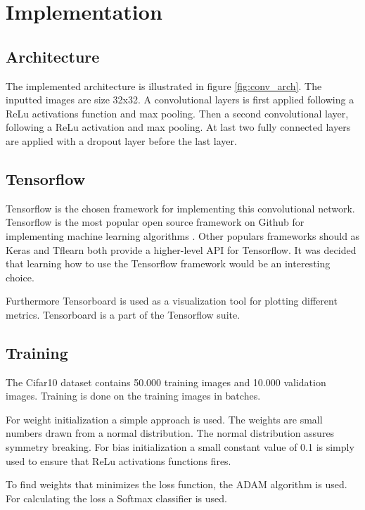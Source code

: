 \chapter{Implementation}
\label{chp:imp}

\section{Architecture}
The implemented architecture is illustrated in figure \ref{fig:conv_arch}. The inputted images are size 32x32. A convolutional layers is first applied following a ReLu activations function and max pooling. Then a second convolutional layer, following a ReLu activation and max pooling. At last two fully connected layers are applied with a dropout layer before the last layer.


\section{Tensorflow}
Tensorflow is the chosen framework for implementing this convolutional network. Tensorflow is the most popular open source framework on Github for implementing machine learning algorithms \citep{ML_frameworks}. Other populars frameworks should as Keras and Tflearn both provide a higher-level API for Tensorflow. It was decided that learning how to use the Tensorflow framework would be an interesting choice.

Furthermore Tensorboard is used as a visualization tool for plotting different metrics. Tensorboard is a part of the Tensorflow suite.

\section{Training}
The Cifar10 dataset contains 50.000 training images and 10.000 validation images. Training is done on the training images in batches. 

For weight initialization a simple approach is used. The weights are small numbers drawn from a normal distribution. The normal distribution assures symmetry breaking. For bias initialization a small constant value of 0.1 is simply used to ensure that ReLu activations functions fires.

To find weights that minimizes the loss function, the ADAM algorithm is used. For calculating the loss a Softmax classifier is used.

